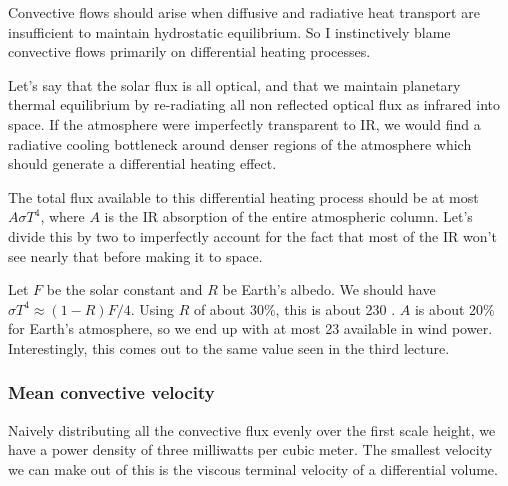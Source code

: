 \documentclass[12pt]{article}
\begin{document}
Convective flows should arise when diffusive and radiative heat transport are insufficient to maintain hydrostatic equilibrium. So I instinctively blame convective flows primarily on differential heating processes.

Let's say that the solar flux is all optical, and that we maintain planetary thermal equilibrium by re-radiating all non reflected optical flux as infrared into space. If the atmosphere were imperfectly transparent to IR, we would find a radiative cooling bottleneck around denser regions of the atmosphere which should generate a differential heating effect.

The total flux available to this differential heating process should be at most \(A \sigma T^4\), where \(A\) is the IR absorption of the entire atmospheric column. Let's divide this by two to imperfectly account for the fact that most of the IR won't see nearly that before making it to space.

Let \(F\) be the solar constant and \(R\) be Earth's albedo. We should have \(\sigma T^4 \approx (1-R)F/4\). Using \(R\) of about 30\%, this is about 230 \wmsq. \(A\) is about 20\% for Earth's atmosphere, so we end up with at most 23 \wmsq available in wind power. Interestingly, this comes out to the same value seen in the third lecture.

\subsubsection{Mean convective velocity}

Naively distributing all the convective flux evenly over the first scale height, we have a power density of three milliwatts per cubic meter. The smallest velocity we can make out of this is the viscous terminal velocity of a differential volume.









\end{document}
